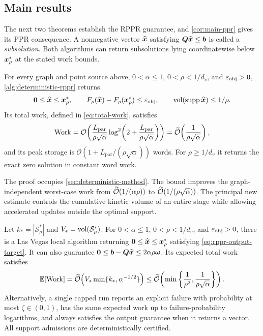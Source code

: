 \subsection{Main results}

The next two theorems establish the RPPR guarantee, and
\cref{cor:main-ppr} gives its PPR consequence.
A nonnegative vector $\widehat{\bm{x}}$ satisfying $\bm{Q}\widehat{\bm{x}}\leq\bm{b}$
is called a \emph{subsolution}. Both algorithms can return subsolutions
lying coordinatewise below $\bm{x}_\rho^*$ at the stated work bounds.

\begin{theorem}
\label{thm:deterministic-rppr}
For every graph and point source above, $0<\alpha\leq1$,
$0<\rho<1/d_v$, and $\varepsilon_{\mathrm{obj}}>0$, \cref{alg:deterministic-rppr} returns
\begin{equation*}
 \bm{0}\leq\widehat{\bm{x}}\leq\bm{x}_\rho^*,\qquad
 F_\rho(\widehat{\bm{x}})-F_\rho(\bm{x}_\rho^*)\leq\varepsilon_{\mathrm{obj}},
 \qquad\operatorname{vol}(\operatorname{supp}\widehat{\bm{x}})\leq1/\rho.
\end{equation*}
Its total work, defined in \cref{eq:total-work}, satisfies
\begin{equation}
 \operatorname{Work}=\mathcal{O}\!\left(\frac{L_{\mathrm{par}}}{\rho\sqrt\alpha}
           \log^2\!\left(2+\frac{L_{\mathrm{par}}}{\rho\sqrt\alpha}\right)\right)
 =\widetilde{\mathcal{O}}\!\left(\frac1{\rho\sqrt\alpha}\right),
 \label{eq:deterministic-main-work}
\end{equation}
and its peak storage is $\mathcal{O}(1+L_{\mathrm{par}}/(\rho\sqrt\alpha))$ words.
For $\rho\geq1/d_v$ it returns the exact zero solution in constant word work.
\end{theorem}

The proof occupies \cref{sec:deterministic-method}. The bound improves
the graph-independent worst-case work from
$\widetilde{\mathcal{O}}(1/(\alpha\rho))$ to $\widetilde{\mathcal{O}}(1/(\rho\sqrt\alpha))$.
The principal new estimate controls the cumulative kinetic volume of an
entire stage while allowing accelerated updates outside the optimal support.

\begin{theorem}
\label{thm:randomized-rppr-main}
Let $k_*=|\mathcal S_\rho^*|$ and $V_*=\operatorname{vol}(\mathcal S_\rho^*)$.
For $0<\alpha\leq1$, $0<\rho<1/d_v$, and $\varepsilon_{\mathrm{obj}}>0$, there is a Las
Vegas local algorithm returning $\bm{0}\leq\widehat{\bm{x}}\leq\bm{x}_\rho^*$
satisfying \cref{eq:rppr-output-target}. It can also guarantee
$\bm{0}\leq\bm{b}-\bm{Q}\widehat{\bm{x}}\leq2\alpha\rho\bm{\omega}$.
Its expected total work satisfies
\begin{equation}
 \mathbb{E}[\operatorname{Work}]=\widetilde{\mathcal{O}}\!\left(V_*\min\{k_*,\alpha^{-1/2}\}\right)
 \leq\widetilde{\mathcal{O}}\!\left(
       \min\left\{\frac1{\rho^2},\frac1{\rho\sqrt\alpha}\right\}\right).
 \label{eq:randomized-adaptive-work}
\end{equation}
Alternatively, a single capped run reports an explicit failure with
probability at most $\zeta\in(0,1)$, has the same expected work up to
failure-probability logarithms, and always satisfies the output guarantee
when it returns a vector. All support admissions are deterministically
certified.
\end{theorem}

